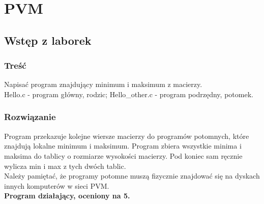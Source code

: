 \newpage
\section{PVM}
	\subsection{Wstęp z laborek}
		\subsubsection{Treść}
			Napisać program znajdujący minimum i maksimum z macierzy.\\
			Hello.c - program główny, rodzic; Hello\_other.c - program podrzędny, potomek.
		\subsubsection{Rozwiązanie}
			Program przekazuje kolejne wiersze macierzy do programów potomnych, które znajdują lokalne minimum i maksimum. Program zbiera wszystkie minima i maksima do tablicy o rozmiarze wysokości macierzy. Pod koniec sam ręcznie wylicza min i max z tych dwóch tablic.\\
			Należy pamiętać, że programy potomne muszą fizycznie znajdować się na dyskach innych komputerów w sieci PVM.\\
			\textbf{Program działający, oceniony na 5.}
